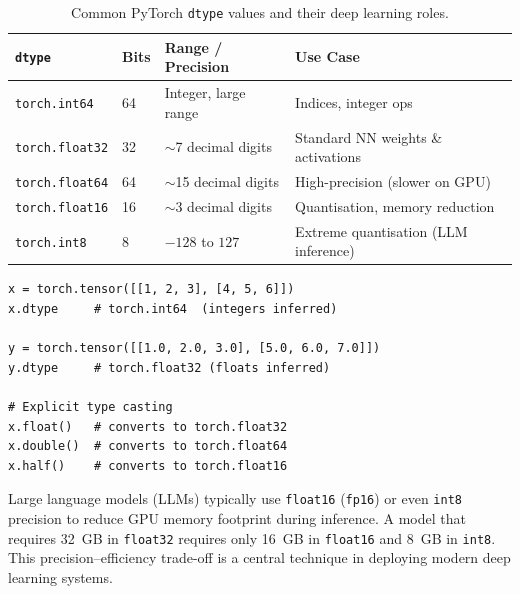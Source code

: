 \documentclass[12pt,a4paper]{article}
\newcommand{\tbf}[1]{\textbf{#1}}
\newcommand{\ttt}[1]{\texttt{#1}}
\begin{document}
\begin{table}[ht]
  \centering
  \caption{Common PyTorch \ttt{dtype} values and their deep learning roles.}
  \label{tab:dtypes}
  \begin{tabular}{llll}
    \toprule
    \tbf{\ttt{dtype}} & \tbf{Bits} & \tbf{Range / Precision} & \tbf{Use Case} \\
    \midrule
    \ttt{torch.int64}   & 64 & Integer, large range    & Indices, integer ops \\
    \ttt{torch.float32} & 32 & $\sim$7 decimal digits  & Standard NN weights \& activations \\
    \ttt{torch.float64} & 64 & $\sim$15 decimal digits & High-precision (slower on GPU) \\
    \ttt{torch.float16} & 16 & $\sim$3 decimal digits  & Quantisation, memory reduction \\
    \ttt{torch.int8}    &  8 & $-128$ to $127$         & Extreme quantisation (LLM inference) \\
    \bottomrule
  \end{tabular}
\end{table}

\begin{lstlisting}[caption={dtype inspection and type casting (V10, 00:39:49).},
                   label={lst:dtype}]
x = torch.tensor([[1, 2, 3], [4, 5, 6]])
x.dtype     # torch.int64  (integers inferred)

y = torch.tensor([[1.0, 2.0, 3.0], [5.0, 6.0, 7.0]])
y.dtype     # torch.float32 (floats inferred)

# Explicit type casting
x.float()   # converts to torch.float32
x.double()  # converts to torch.float64
x.half()    # converts to torch.float16
\end{lstlisting}

\begin{keyinsight}[title=Quantisation and Large Language Models]
Large language models (LLMs) typically use \ttt{float16} (\ttt{fp16}) or
even \ttt{int8} precision to reduce GPU memory footprint during inference.
A model that requires 32~GB in \ttt{float32} requires only 16~GB in
\ttt{float16} and 8~GB in \ttt{int8}. This precision--efficiency trade-off
is a central technique in deploying modern deep learning systems.
\end{keyinsight}
\end{document}
